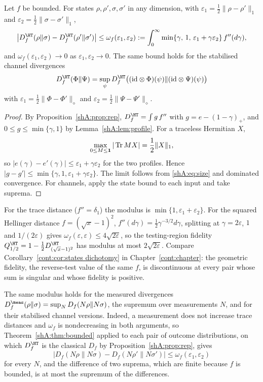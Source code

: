 \begin{theorem}\label{shA:thm:bounded}
Let $f$ be bounded. For states $\rho,\rho',\sigma,\sigma'$ in any dimension, with $\varepsilon_1=\frac12\|\rho-\rho'\|_1$ and $\varepsilon_2=\frac12\|\sigma-\sigma'\|_1$,
\[
\big|D^\HT_f(\rho\|\sigma)-D^\HT_f(\rho'\|\sigma')\big|\le\omega_f(\varepsilon_1,\varepsilon_2):=\int_0^\infty\min\{\gamma,\,1,\,\varepsilon_1+\gamma\varepsilon_2\}\,f''(d\gamma),
\]
and $\omega_f(\varepsilon_1,\varepsilon_2)\to0$ as $\varepsilon_1,\varepsilon_2\to0$. The same bound holds for the stabilised channel divergences
\[
D^\HT_f(\Phi\|\Psi)=\sup_\psi D^\HT_f\big((\id\otimes\Phi)(\psi)\|(\id\otimes\Psi)(\psi)\big)
\]
with $\varepsilon_1=\frac12\|\Phi-\Phi'\|_\diamond$ and $\varepsilon_2=\frac12\|\Psi-\Psi'\|_\diamond$.
\end{theorem}

\begin{proof}
By Proposition~\ref{shA:prop:rep}, $D^\HT_f=\int g\,f''$ with $g=e-(1-\gamma)_+$, and $0\le g\le\min\{\gamma,1\}$ by Lemma~\ref{shA:lem:profile}. For a traceless Hermitian $X$,
\[
\max_{0\le M\le\mathbf 1}|\operatorname{Tr} MX|=\frac12\|X\|_1,
\]
so $|e(\gamma)-e'(\gamma)|\le\varepsilon_1+\gamma\varepsilon_2$ for the two profiles. Hence $|g-g'|\le\min\{\gamma,1,\varepsilon_1+\gamma\varepsilon_2\}$. The limit follows from \eqref{shA:eq:size} and dominated convergence. For channels, apply the state bound to each input and take suprema.
\end{proof}

For the trace distance ($f''=\delta_1$) the modulus is $\min\{1,\varepsilon_1+\varepsilon_2\}$. For the squared Hellinger distance $f=(\sqrt x-1)^2$, $f''(d\gamma)=\frac12\gamma^{-3/2}d\gamma$, splitting at $\gamma=2\varepsilon$, $1$ and $1/(2\varepsilon)$ gives $\omega_f(\varepsilon,\varepsilon)\le4\sqrt{2\varepsilon}$, so the testing-region fidelity $Q^\HT_{1/2}=1-\frac12D^\HT_{(\sqrt x-1)^2}$ has modulus at most $2\sqrt{2\varepsilon}$. Compare Corollary~\ref{cont:cor:states dichotomy} in Chapter~\ref{cont:chapter}: the geometric fidelity, the reverse-test value of the same $f$, is discontinuous at every pair whose sum is singular and whose fidelity is positive.

The same modulus holds for the measured divergences $D^\meas_f(\rho\|\sigma)=\sup_N D_f(N\rho\|N\sigma)$, the supremum over measurements $N$, and for their stabilised channel versions. Indeed, a measurement does not increase trace distances and $\omega_f$ is nondecreasing in both arguments, so Theorem~\ref{shA:thm:bounded} applied to each pair of outcome distributions, on which $D^\HT_f$ is the classical $D_f$ by Proposition~\ref{shA:prop:rep}, gives
\[
|D_f(N\rho\|N\sigma)-D_f(N\rho'\|N\sigma')|\le\omega_f(\varepsilon_1,\varepsilon_2)
\]
for every $N$, and the difference of two suprema, which are finite because $f$ is bounded, is at most the supremum of the differences.

